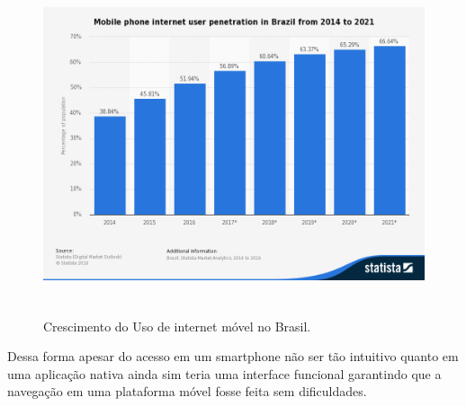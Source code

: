 \begin{figure}[htb]
\includegraphics[height=10cm]{figuras/mobile_internet}
\caption{\label{fig:mobile_internet} Crescimento do Uso de internet móvel no Brasil.}
\end{figure}
\par Dessa forma apesar do acesso em um smartphone não ser tão intuitivo quanto em uma aplicação nativa ainda sim teria uma interface funcional garantindo que a navegação em uma plataforma móvel fosse feita sem dificuldades.
